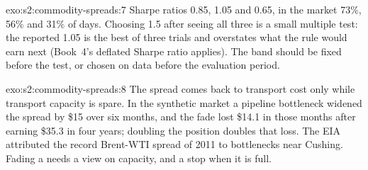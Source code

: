 \begin{solution}{exo:s2:commodity-spreads:7}
Sharpe ratios 0.85, 1.05 and 0.65, in the market 73\%, 56\% and 31\% of days. Choosing 1.5 after seeing all three is a small multiple test:
the reported 1.05 is the best of three trials and overstates what the rule would earn next (Book~4's deflated Sharpe ratio applies). The band should
be fixed before the test, or chosen on data before the evaluation period.
\end{solution}

\begin{solution}{exo:s2:commodity-spreads:8}
The spread comes back to transport cost only while transport capacity is spare. In the synthetic market a pipeline bottleneck widened the spread by
\$15 over six months, and the fade lost \$14.1 in those months after earning \$35.3 in four years; doubling the position doubles that loss. The EIA
attributed the record Brent-WTI spread of 2011 to bottlenecks near Cushing. Fading a  needs a view on capacity, and a stop when it
is full.
\end{solution}

